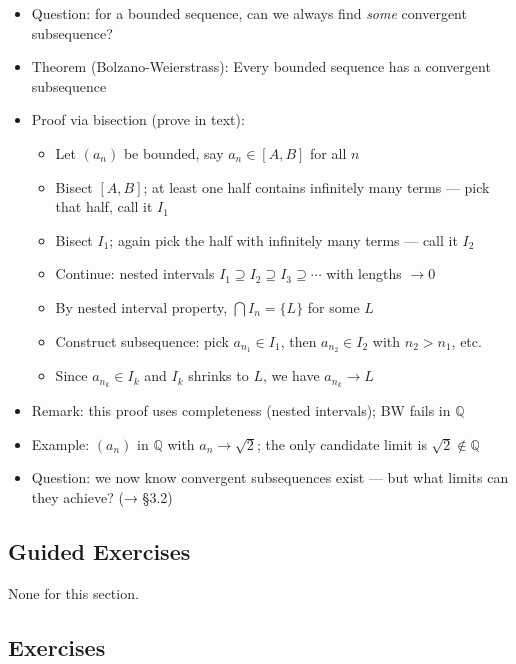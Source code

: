 \documentclass[
  10pt,
  letterpaper,
]{scrbook}
\providecommand{\tightlist}{%
  \setlength{\itemsep}{0pt}\setlength{\parskip}{0pt}}
\newcommand{\QQ}{\mathbb{Q}}
\begin{document}
\begin{itemize}
\tightlist
\item
  Question: for a bounded sequence, can we always find \emph{some}
  convergent subsequence?
\item
  Theorem (Bolzano-Weierstrass): Every bounded sequence has a convergent
  subsequence
\item
  Proof via bisection (prove in text):

  \begin{itemize}
  \tightlist
  \item
    Let \((a_n)\) be bounded, say \(a_n \in [A, B]\) for all \(n\)
  \item
    Bisect \([A, B]\); at least one half contains infinitely many terms
    --- pick that half, call it \(I_1\)
  \item
    Bisect \(I_1\); again pick the half with infinitely many terms ---
    call it \(I_2\)
  \item
    Continue: nested intervals
    \(I_1 \supseteq I_2 \supseteq I_3 \supseteq \cdots\) with lengths
    \(\to 0\)
  \item
    By nested interval property, \(\bigcap I_n = \{L\}\) for some \(L\)
  \item
    Construct subsequence: pick \(a_{n_1} \in I_1\), then
    \(a_{n_2} \in I_2\) with \(n_2 > n_1\), etc.
  \item
    Since \(a_{n_k} \in I_k\) and \(I_k\) shrinks to \(L\), we have
    \(a_{n_k} \to L\)
  \end{itemize}
\item
  Remark: this proof uses completeness (nested intervals); BW fails in
  \(\QQ\)
\item
  Example: \((a_n)\) in \(\QQ\) with \(a_n \to \sqrt{2}\); the only
  candidate limit is \(\sqrt{2} \notin \QQ\)
\item
  Question: we now know convergent subsequences exist --- but what
  limits can they achieve? (→ §3.2)
\end{itemize}

\subsection{Guided Exercises}\label{guided-exercises-6}

None for this section.

\subsection{Exercises}\label{exercises-11}
\end{document}
